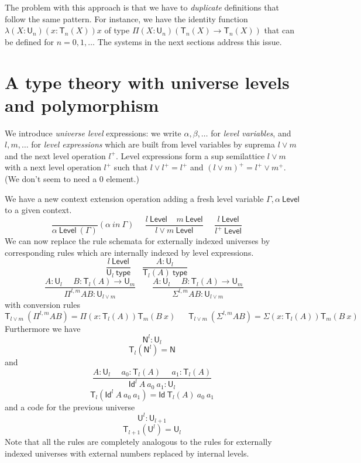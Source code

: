 \documentclass[11pt,a4paper]{article}
\newcommand{\Id}{\mathsf{Id}}
\def\NN{\mathsf{N}}
\def\UU{\mathsf{U}}
\def\Level{\mathsf{Level}}
\newcommand{\type}{\mathsf{type}}
\newcommand{\T}{\mathsf{T}}
\begin{document}
The problem with this approach is that we have to {\em duplicate} definitions that follow
the same pattern. For instance, we have the identity function $\lambda (X:\UU_n)(x:\T_n(X))x$
of type $\Pi (X:\UU_n)(\T_n(X)\rightarrow \T_n(X))$ that can be defined for $n = 0,1,\dots$
The systems in the next sections address this issue.

\section{A type theory with universe levels and polymorphism }\label{internal}

We introduce {\em universe level} expressions: we write $\alpha,\beta,\dots$
for {\em level variables}, and $l,m,\dots$ for {\em level expressions} which are built from level variables
by suprema $l \vee m$ and the next level operation $l^+$.
Level expressions form a sup semilattice $l\vee m$
with a next level operation $l^+$ such that $l \vee l^+ = l^+$
and $(l\vee m)^+ = l^+\vee m^+$. (We don't seem to need a $0$ element.)

We have a new context extension operation adding a fresh level variable $\Gamma,\alpha~\Level$
to a given context.
$$
\frac{}{\alpha~\Level~(\Gamma)}(\alpha~in~\Gamma)~~~~~~
\frac{l~\Level~~~~~m~\Level}{l\vee m~\Level}~~~~~~
\frac{l~\Level}{l^+~\Level}~~~~~~
$$
We can now replace the rule schemata for externally indexed universes by corresponding rules which are internally indexed by level expressions.
$$
\frac{l~\Level}{\UU_{l}~\type}~~~~~~
\frac{A:\UU_{l}}{\T_{l}(A)~\type}~~~~~~
$$
$$
\frac{A:\UU_{l}~~~~~~B:\T_{l}(A)\rightarrow \UU_{m}}
     {\Pi^{l,m} A B:\UU_{l\vee m}}~~~~~~~~~
\frac{A:\UU_{l}~~~~~~B:\T_{l}(A)\rightarrow \UU_{m}}
     {\Sigma^{l,m} A B:\UU_{l\vee m}}~~~~~~~~~
$$
with conversion rules
$$
\T_{l\vee m}~(\Pi^{l,m} A B) = \Pi (x:\T_{l}(A)) \T_{m}(B~x)~~~~~~~
\T_{l\vee m}~(\Sigma^{l,m} A B) = \Sigma (x:\T_{l}(A)) \T_{m}(B~x)~~~~~~~
$$
Furthermore we have $$\NN^{l}:\UU_{l}$$
$$\T_{l}(\NN^{l}) = \NN$$
and
$$
\frac{A:\UU_l~~~~~~a_0:\T_l(A)~~~~~~a_1:\T_l(A)}
{\Id^l~A~a_0~a_1:\UU_l}
$$
$$\T_l(\Id^l~A~a_0~a_1) = \Id~\T_l(A)~a_0~a_1$$
and a code for the previous universe
$${\UU^{l}}:\UU_{l + 1}$$
$$\T_{l + 1}({\UU^{l}}) = \UU_{l}$$
Note that all the rules are completely analogous to the rules for externally indexed universes with external numbers replaced by internal levels.
%
%
%
%
%
%
%
\end{document}
